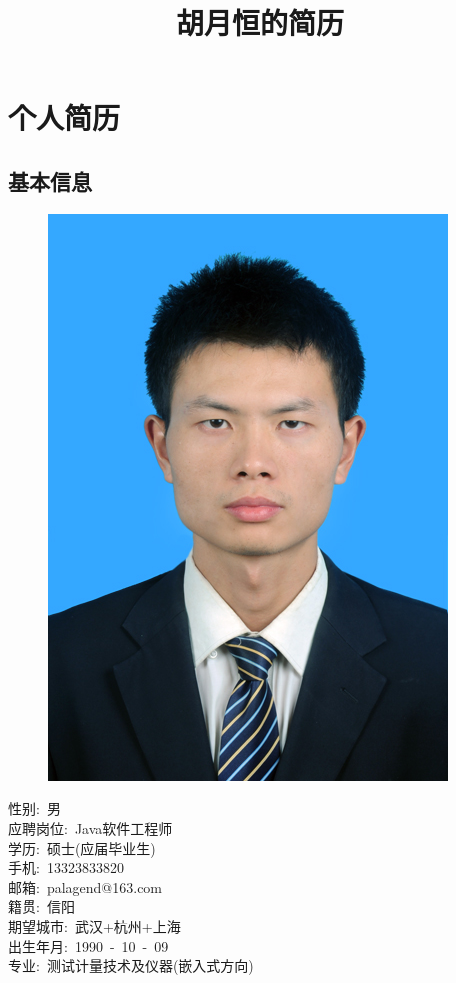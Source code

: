 \documentclass[12pt]{ctexart}
\title{胡月恒的简历}
\begin{document}
\maketitle
\tableofcontents

\section{个人简历}
\label{sec-1}
\subsection{基本信息}
\label{sec-1-1}
\begin{figure}
  \vspace{-25pt}
  \begin{center}
    \includegraphics{portrait.jpg}
  \end{center}
\end{figure}
性别:\ 男\\
应聘岗位:\ Java软件工程师\\
学历:\ 硕士(应届毕业生)\\
手机:\ 13323833820\\
邮箱:\ palagend@163.com\\
籍贯:\ 信阳\\
期望城市:\ 武汉+杭州+上海\\
出生年月:\ 1990\ -\ 10\ -\ 09\\
专业:\ 测试计量技术及仪器(嵌入式方向)\\
\end{document}
